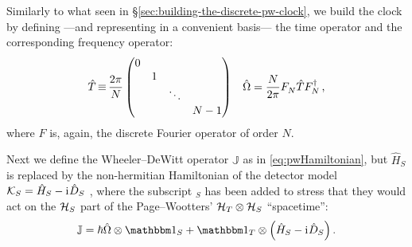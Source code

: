 Similarly to what seen in \S \ref{sec:building-the-discrete-pw-clock}, we build
the clock by defining ---and representing in a convenient basis---
the time operator and the corresponding frequency operator:
\begin{align}
  \hat{T} \operatorname*{\equiv} \frac{2\pi}{N}
  \begin{pmatrix}
    0           &       &       &       \\
                &1      &       &       \\
                &       &\ddots &       \\
                &       &       &N-1
  \end{pmatrix}
  &&
  \hat{\Omega} = \frac{N}{2\pi} F^{}_{N} \hat{T} F^{\dagger}_{N} \, \text{,}
\end{align}
where $F$ is, again, the discrete Fourier operator of order $N$.

Next we define the Wheeler--DeWitt operator $\mathbb{J}$ as in
\eqref{eq:pwHamiltonian}, but $\hat{H}_S$ is replaced by the non-hermitian
Hamiltonian of the detector model
$\mathcal{K}_S = \hat{H}_S - \mathrm{i}\mkern1mu \hat{D}_S$
\parencite{RuschhauptAbsorption},
where the subscript $_S$ has been added to stress
that they would act on the $\mathcal{H}_S$ part
of the Page--Wootters' $\mathcal{H}_T \otimes \mathcal{H}_S$ ``spacetime'':
\begin{equation}
  \mathbb{J} = \hbar\hat{\Omega}\ox\idop_S + \idop_T\ox\qty(\hat{H}_S -\iu \hat{D}_S) \,\text{.}
\end{equation}

